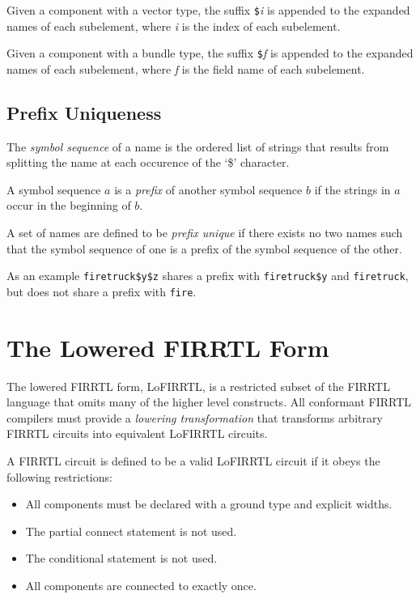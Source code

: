 \documentclass[12pt]{article}
\begin{document}
Given a component with a vector type, the suffix \verb|$|{\em i} is appended to the expanded names of each subelement, where {\em i} is the index of each subelement.

Given a component with a bundle type, the suffix \verb|$|{\em f} is appended to the expanded names of each subelement, where {\em f} is the field name of each subelement.

\subsection{Prefix Uniqueness} \label{prefix_unique}

The {\em symbol sequence} of a name is the ordered list of strings that results from splitting the name at each occurence of the `\$' character.

A symbol sequence $a$ is a {\em prefix} of another symbol sequence $b$ if the strings in $a$ occur in the beginning of $b$.

A set of names are defined to be {\em prefix unique} if there exists no two names such that the symbol sequence of one is a prefix of the symbol sequence of the other.

As an example \verb|firetruck$y$z| shares a prefix with \verb|firetruck$y| and \verb|firetruck|, but does not share a prefix with \verb|fire|.

\section{The Lowered FIRRTL Form}

The lowered FIRRTL form, LoFIRRTL, is a restricted subset of the FIRRTL language that omits many of the higher level constructs. All conformant FIRRTL compilers must provide a {\em lowering transformation} that transforms arbitrary FIRRTL circuits into equivalent LoFIRRTL circuits.

A FIRRTL circuit is defined to be a valid LoFIRRTL circuit if it obeys the following restrictions:
\begin{itemize}
\item All components must be declared with a ground type and explicit widths.
\item The partial connect statement is not used.
\item The conditional statement is not used.
\item All components are connected to exactly once.
\end{itemize}
\end{document}
